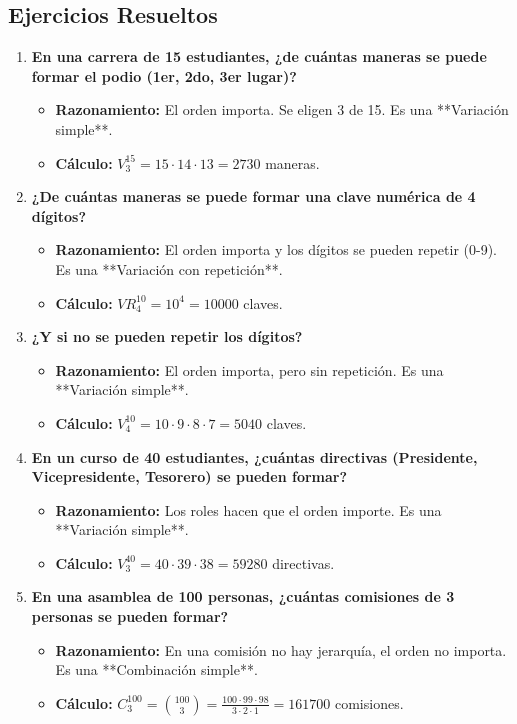 \documentclass[12pt, letterpaper]{article}
\begin{document}
\subsection*{Ejercicios Resueltos}
\begin{enumerate}[leftmargin=*,label=\arabic*.]
	\item \textbf{En una carrera de 15 estudiantes, ¿de cuántas maneras se puede formar el podio (1er, 2do, 3er lugar)?}
	      \begin{itemize}
		      \item \textbf{Razonamiento:} El orden importa. Se eligen 3 de 15. Es una **Variación simple**.
		      \item \textbf{Cálculo:} $V_3^{15} = 15 \cdot 14 \cdot 13 = 2730$ maneras.
	      \end{itemize}

	\item \textbf{¿De cuántas maneras se puede formar una clave numérica de 4 dígitos?}
	      \begin{itemize}
		      \item \textbf{Razonamiento:} El orden importa y los dígitos se pueden repetir (0-9). Es una **Variación con repetición**.
		      \item \textbf{Cálculo:} $VR_4^{10} = 10^4 = 10000$ claves.
	      \end{itemize}

	\item \textbf{¿Y si no se pueden repetir los dígitos?}
	      \begin{itemize}
		      \item \textbf{Razonamiento:} El orden importa, pero sin repetición. Es una **Variación simple**.
		      \item \textbf{Cálculo:} $V_4^{10} = 10 \cdot 9 \cdot 8 \cdot 7 = 5040$ claves.
	      \end{itemize}

	\item \textbf{En un curso de 40 estudiantes, ¿cuántas directivas (Presidente, Vicepresidente, Tesorero) se pueden formar?}
	      \begin{itemize}
		      \item \textbf{Razonamiento:} Los roles hacen que el orden importe. Es una **Variación simple**.
		      \item \textbf{Cálculo:} $V_3^{40} = 40 \cdot 39 \cdot 38 = 59280$ directivas.
	      \end{itemize}
	      
	\item \textbf{En una asamblea de 100 personas, ¿cuántas comisiones de 3 personas se pueden formar?}
	      \begin{itemize}
		      \item \textbf{Razonamiento:} En una comisión no hay jerarquía, el orden no importa. Es una **Combinación simple**.
		      \item \textbf{Cálculo:} $C_3^{100} = \binom{100}{3} = \frac{100 \cdot 99 \cdot 98}{3 \cdot 2 \cdot 1} = 161700$ comisiones.
	      \end{itemize}
\end{enumerate}
\newpage
\end{document}
